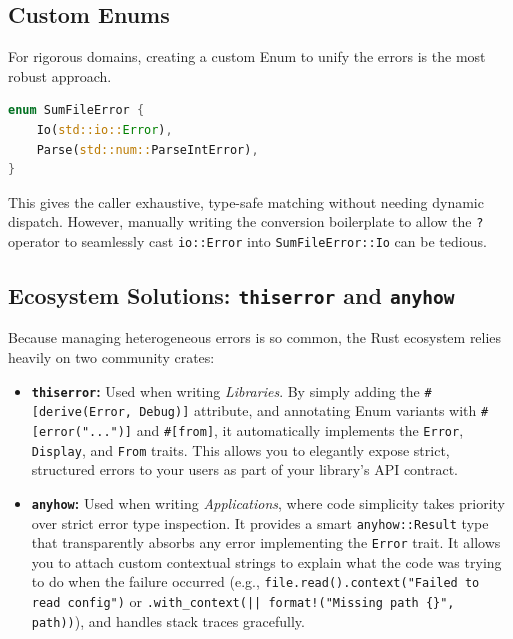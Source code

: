 \subsection{Custom Enums}

For rigorous domains, creating a custom Enum to unify the errors is the most robust approach.

\begin{lstlisting}[language=Rust]
enum SumFileError {
    Io(std::io::Error),
    Parse(std::num::ParseIntError),
}
\end{lstlisting}

This gives the caller exhaustive, type-safe matching without needing dynamic dispatch. However, manually writing the conversion boilerplate to allow the \texttt{?} operator to seamlessly cast \texttt{io::Error} into \texttt{SumFileError::Io} can be tedious.

\subsection{Ecosystem Solutions: \texttt{thiserror} and \texttt{anyhow}}

Because managing heterogeneous errors is so common, the Rust ecosystem relies heavily on two community crates:

\begin{itemize}
    \item \textbf{\texttt{thiserror}:} Used when writing \emph{Libraries}. By simply adding the \texttt{\#[derive(Error, Debug)]} attribute, and annotating Enum variants with \texttt{\#[error("...")]} and \texttt{\#[from]}, it automatically implements the \texttt{Error}, \texttt{Display}, and \texttt{From} traits. This allows you to elegantly expose strict, structured errors to your users as part of your library's API contract.
    \item \textbf{\texttt{anyhow}:} Used when writing \emph{Applications}, where code simplicity takes priority over strict error type inspection. It provides a smart \texttt{anyhow::Result} type that transparently absorbs any error implementing the \texttt{Error} trait. It allows you to attach custom contextual strings to explain what the code was trying to do when the failure occurred (e.g., \texttt{file.read().context("Failed to read config")} or \texttt{.with\_context(|| format!("Missing path \{\}", path))}), and handles stack traces gracefully.
\end{itemize}

